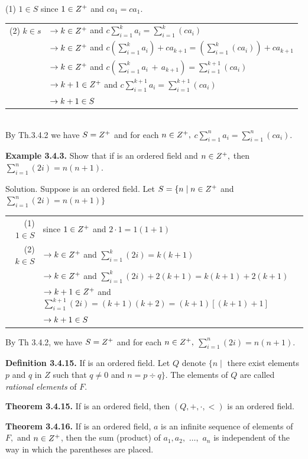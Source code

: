 \begin{large}
(1) $1\in S$ since $1\in Z^{+}$ and $ca_{1} = ca_{1}.$\nl

\begin{tabular}{r l}
(2) $k\in s$&$\to k\in Z^{+}$ and $c\sum_{i=1}^{k}a_{i} = \sum_{i=1}^{k}(ca_{i})$\\
&$\to k\in Z^{+}$ and $c\left(\sum_{i=1}^{k}a_{i}\right) + ca_{k+1} = \left(\sum_{i=1}^{k}(ca_{i})\right) + ca_{k+1}$\\
&$\to k\in Z^{+}$ and $c\left(\sum_{i=1}^{k} a_{i}  \, + \, a_{k+1}\right) = \sum_{i=1}^{k+1}(ca_{i})$\\
&$\to k+ 1\in Z^{+}$ and $c\sum_{i=1}^{k+1}a_{i} = \sum_{i=1}^{k+1}(ca_{i})$\\
&$\to k+1\in S$\\
\end{tabular}\\
By Th.3.4.2 we have $S = Z^{+}$ and for each $n\in Z^{+} ,$ $c\sum_{i=1}^{n}a_{i} = \sum_{i=1}^{n}(ca_{i}).$ \nl

\textbf{Example 3.4.3.} Show that if \of is an ordered field and $n\in Z^{+},$ then $\sum_{i=1}^{n}(2i) = n(n+1).$\nl

Solution. Suppose \of is an ordered field. \nl
Let $S=\{ n \mid n\in Z^{+}$ and $\sum_{i=1}^{n}(2i) = n(n+1) \}$

\newpage

\begin{tabular}{r l}
(1) $1\in S$& since $1\in Z^{+}$ and $2\cdot 1 =1(1+1)$\\
(2) $k\in S$&$\to k\in Z^{+} $ and $\sum_{i=1}^{k}(2i)=k(k+1) $\\
&$\to k\in Z^{+} $ and $\sum_{i=1}^{k}(2i) + 2(k+1)= k(k+1)+2(k+1) $\\
&$\to k+1\in Z^{+}$ and $ \sum_{i=1}^{k+1}(2i)=(k+1)(k+2)=(k+1)[(k+1)+1] $\\
&$\to k+1\in S$\\
\end{tabular}


By Th 3.4.2, we have $S = Z^{+}$ and for each $n\in Z^{+},$ $ \sum_{i=1}^{n}(2i)=n(n+1).$\nl

\textbf{Definition 3.4.15.} If \of is an ordered field. Let $Q$ denote $\{n \mid$ there exist elements $p$ and $q$ in $Z$ such that $q \neq 0$ and $n=p\div q\}$. The elements of $Q$ are called \textit{rational elements} of $F.$\nl

\textbf{Theorem 3.4.15.} If \of is an ordered field, then $(Q,+,\cdot,<)$ is an ordered field.\nl

\textbf{Theorem 3.4.16.} If \of  is an ordered field, $a$ is an infinite sequence of elements of $F,$ and $n\in Z^{+}$, then the sum (product) of $a_{1} ,a_{2}, \,\, \dots , \,\, a_{n}$ is
independent of the way in which the parentheses are placed.\nl


\end{large}
